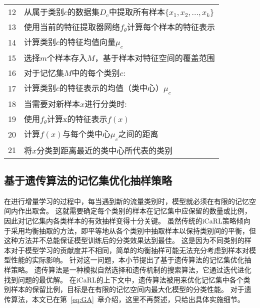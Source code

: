 \begin{table}[htbp]
\begin{tabularx}{1.0\textwidth}{cl}
		12 & \quad\quad\quad\quad 从属于类别$c$的数据集$D_c$中提取所有样本$\{x_1, x_2, ..., x_k\}$                     \\
		13 & \quad\quad\quad\quad 使用当前的特征提取器网络$f_{\theta}$计算每个样本的特征表示                           \\
		14 & \quad\quad\quad\quad 计算类别$c$的特征均值向量$\mu_c$                                                     \\
		15 & \quad\quad\quad\quad 选择$m$个样本存入$M$，基于样本对特征空间的覆盖范围                                   \\
		16 & \quad\quad 对于记忆集$M$中的每个类别$c$:                                                                  \\
		17 & \quad\quad\quad\quad 计算类别$c$的特征表示的均值（类中心）$\mu_c$                                         \\
		18 & \quad\quad 当需要对新样本$x$进行分类时:                                                                   \\
		19 & \quad\quad\quad\quad 使用$f_{\theta}$计算x的特征表示$f(x)$                                                \\
		20 & \quad\quad\quad\quad 计算$f(x)$与每个类中心$\mu_c$之间的距离                                              \\
		21 & \quad\quad\quad\quad 将$x$分类到距离最近的类中心所代表的类别                                              \\
		\bottomrule
	\end{tabularx}
\end{table}

\subsection{基于遗传算法的记忆集优化抽样策略}
在进行增量学习的过程中，每当遇到新的流量类别时，模型就必须在有限的记忆空间内作出取舍。
这就需要确定每个类别的样本在记忆集中应保留的数量或比例，因此对记忆集内各类样本的有效抽样变得十分关键。
虽然传统的iCaRL策略倾向于采用均衡抽取的方法，即平等地从各个类别中抽取样本以保持类别间的平衡，但这种方法并不总能保证模型训练后的分类效果达到最佳。
这是因为不同类别的样本对于模型学习的贡献度并不相同，简单的均衡抽样可能无法充分考虑到样本对模型性能的实际影响。
针对这一问题，本小节提出了基于遗传算法的记忆集优化抽样策略。
遗传算法是一种模拟自然选择和遗传机制的搜索算法，它通过迭代进化找到问题的最优解。
在iCaRL的上下文中，遗传算法被用来优化记忆集中各个类别样本的保留比例，目标是在有限的记忆空间内最大化模型的分类性能。
对于遗传算法，本文已在第~\ref{eq:GA}~章介绍，这里不再赘述，只给出具体实施细节。\par


